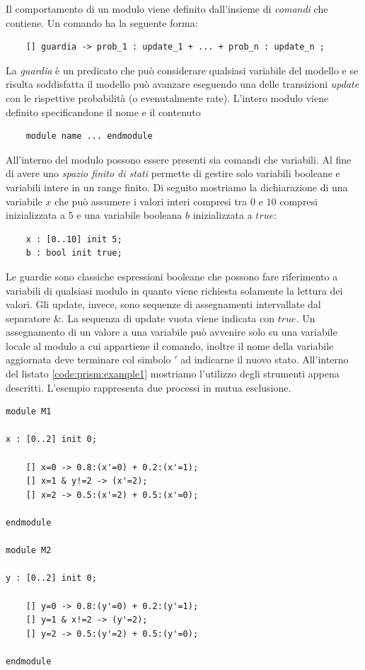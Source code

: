 Il comportamento di un modulo viene definito dall'insieme di \emph{comandi} che contiene. Un comando ha la seguente forma:
\begin{verbatim}
	[] guardia -> prob_1 : update_1 + ... + prob_n : update_n ;
\end{verbatim}
La \emph{guardia} è un predicato che può considerare qualsiasi variabile del modello e se risulta soddisfatta il modello può avanzare eseguendo una delle transizioni \emph{update} con le rispettive probabilità (o evenutalmente rate). L'intero modulo viene definito specificandone il nome e il contenuto
\begin{verbatim}
	module name ... endmodule
\end{verbatim}
All'interno del modulo possono essere presenti sia comandi che variabili. Al fine di avere uno \emph{spazio finito di stati} \prism{} permette di gestire solo variabili booleane e variabili intere in un range finito. Di seguito mostriamo la dichiarazione di una variabile $x$ che può assumere i valori interi compresi tra $0$ e $10$ compresi inizializzata a 5 e una variabile booleana $b$ inizializzata a $true$:
\begin{verbatim}
	x : [0..10] init 5;
	b : bool init true;
\end{verbatim}
Le guardie sono classiche espressioni booleane che possono fare riferimento a variabili di qualsiasi modulo in quanto viene richiesta solamente la lettura dei valori. Gli update, invece, sono sequenze di assegnamenti intervallate dal separatore $\&$. La sequenza di update vuota viene indicata con $true$. Un assegnamento di un valore a una variabile può avvenire solo su una variabile locale al modulo a cui appartiene il comando, inoltre il nome della variabile aggiornata deve terminare col simbolo $'$ ad indicarne il nuovo stato. All'interno del listato \ref{code:prism:example1} mostriamo l'utilizzo degli strumenti appena descritti. L'esempio rappresenta due processi in mutua esclusione.
\begin{lstlisting}[language=prism,style=eclipse,caption={Esempio di definizione dei moduli in \prism{}},label=code:prism:example1]
module M1

x : [0..2] init 0;

    [] x=0 -> 0.8:(x'=0) + 0.2:(x'=1);
    [] x=1 & y!=2 -> (x'=2);
    [] x=2 -> 0.5:(x'=2) + 0.5:(x'=0);

endmodule 

module M2

y : [0..2] init 0;

    [] y=0 -> 0.8:(y'=0) + 0.2:(y'=1);
    [] y=1 & x!=2 -> (y'=2);
    [] y=2 -> 0.5:(y'=2) + 0.5:(y'=0);

endmodule
\end{lstlisting}
